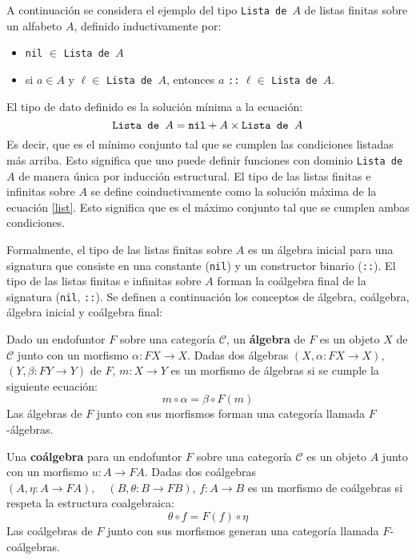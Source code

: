 A continuación se considera el ejemplo del tipo \texttt{Lista de $A$} de listas finitas sobre un alfabeto $A$, definido inductivamente por:
\begin{itemize}[label=$\blacktriangleright$]
	\item \texttt{nil} $\in$ \texttt{Lista de $A$}
	\item si $a \in A$ y $\ell \in$ \texttt{Lista de $A$}, entonces $a$ \texttt{::} $\ell \in$ \texttt{Lista de $A$}. 
\end{itemize}

El tipo de dato definido es la solución  mínima a la ecuación:
\begin{equation}\label{list}
\text{\tt Lista de $A$} = \text{\tt nil} + A \times \text{\tt Lista de $A$}
\end{equation}
Es decir, que es el mínimo conjunto tal que se cumplen las condiciones listadas más arriba. Esto significa que uno puede definir funciones con dominio \texttt{Lista de $A$} de manera única por inducción estructural. El tipo de las listas finitas e infinitas sobre $A$ se define coinductivamente como la solución máxima de la ecuación \ref{list}. Esto significa que es el máximo conjunto tal que se cumplen ambas condiciones. 

Formalmente, el tipo de las listas finitas sobre $A$ es un álgebra inicial para una signatura que consiste en una constante (\texttt{nil}) y un constructor binario (\texttt{::}). El tipo de las listas finitas e infinitas sobre $A$ forman la coálgebra final de la signatura (\texttt{nil}, \texttt{::}). Se definen a continuación los conceptos de álgebra, coálgebra, álgebra inicial y coálgebra final:

\begin{definition}
Dado un endofuntor $\mathit{F}$ sobre una categoría $\mathscr{C}$, un \textbf{álgebra} de $\mathit{F}$ es un objeto $X$ de $\mathscr{C}$ junto con un morfismo $\alpha : \mathit{F}X \rightarrow X$. Dadas dos álgebras $(X, \alpha : \mathit{F}X \rightarrow X)$, $(Y, \beta : \mathit{F}Y \rightarrow Y)$ de $F$, $m : X \rightarrow Y$ es un morfismo de álgebras si se cumple la siguiente ecuación:
\begin{equation*}
m \circ \alpha = \beta \circ \mathit{F}(m)
\end{equation*}
Las álgebras de $\mathit{F}$ junto con sus morfismos forman una categoría llamada $\mathit{F}$-álgebras. 
\end{definition}

\begin{definition}[Coálgebra]
Una \textbf{coálgebra} para un endofuntor $\mathit{F}$ sobre una categoría $\mathscr{C}$ es un objeto $A$ junto con un morfismo $u : A \rightarrow \mathit{F} A$. Dadas dos coálgebras $(A, \eta : A \rightarrow \mathit{F}A), \quad (B, \theta : B \rightarrow \mathit{F}B)$, $f : A \rightarrow B$ es un morfismo de coálgebras si respeta la estructura coalgebraica: 
\begin{equation*}
\theta \circ f = \mathit{F}(f) \circ \eta
\end{equation*} 
Las coálgebras de $\mathit{F}$ junto con sus morfismos generan una categoría llamada $\mathit{F}$-coálgebras.
\end{definition}

